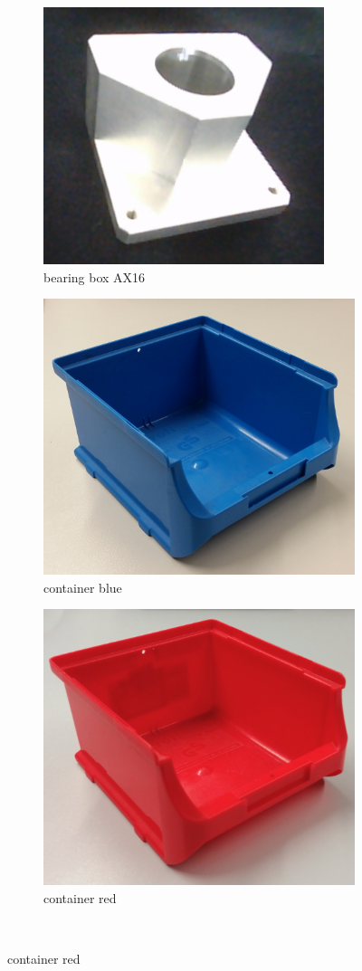 \begin{figure}
\begin{subfigure}{.3\textwidth}
  			\centering
  			\includegraphics[width=.5\linewidth]{images/bearingBoxAX16}
  			\caption{bearing box AX16}
  			\label{fig:bearingBoxAX16}
		\end{subfigure}
		\begin{subfigure}{.3\textwidth}
  			\centering
  			\includegraphics[width=.5\linewidth]{images/container_blue}
  			\caption{container blue \cite{github_robocup@work}}
  			\label{fig:container_blue}
		\end{subfigure}
		\begin{subfigure}{.3\textwidth}
  			\centering
  			\includegraphics[width=.5\linewidth]{images/container_red}
  			\caption{container red \cite{github_robocup@work}}
  			\label{fig:container_red}
		\end{subfigure}\\

\end{figure}
